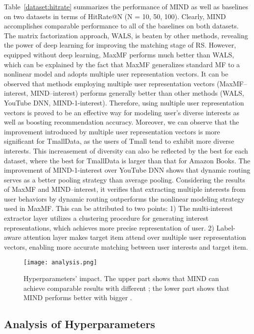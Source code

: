 \documentclass[sigconf]{acmart}
\begin{document}
Table~\ref{dataset:hitrate} summarizes the performance of MIND as well as baselines on two datasets in terms of HitRate@N (N = 10, 50, 100).
Clearly, MIND accomplishes comparable performance to all of the baselines on both datasets.
The matrix factorization approach, WALS, is beaten by other methods, revealing the power of deep learning for improving the matching stage of RS.
However, equipped without deep learning, MaxMF performs much better than WALS, which can be explained by the fact that MaxMF generalizes standard MF to a nonlinear model and adopts multiple user representation vectors.
It can be observed that methods employing multiple user representation vectors (MaxMF--interest, MIND--interest) performs generally better than other methods (WALS, YouTube DNN, MIND-1-interest).
Therefore, using multiple user representation vectors is proved to be an effective way for modeling user's diverse interests as well as boosting recommendation accuracy.
Moreover, we can observe that the improvement introduced by multiple user representation vectors is more significant for TmallData, as the users of Tmall tend to exhibit more diverse interests.
This increasement of diversity can also be reflected by the best  for each dataset, where
the best  for TmallData is larger than that for Amazon Books.
The improvement of MIND-1-interest over YouTube DNN shows that dynamic routing serves as a better pooling strategy than average pooling.
Considering the results of MaxMF and MIND--interest, it verifies that extracting multiple interests from user behaviors by dynamic routing outperforms the nonlinear modeling strategy used in MaxMF.
This can be attributed to two points:
1) The multi-interest extractor layer utilizes a clustering procedure for generating interest representations, which achieves more precise representation of user.
2) Label-aware attention layer makes target item attend over multiple user representation vectors, enabling more accurate matching between user interests and target item.

\begin{figure}[h]
  \centering
  \texttt{[image: analysis.png]}
  \caption{Hyperparameters' impact. The upper part shows that MIND can achieve comparable results with different ; the lower part shows that MIND performs better with bigger .}
  \label{fig:analysis}
\end{figure}

\subsection{Analysis of Hyperparameters}
\end{document}
